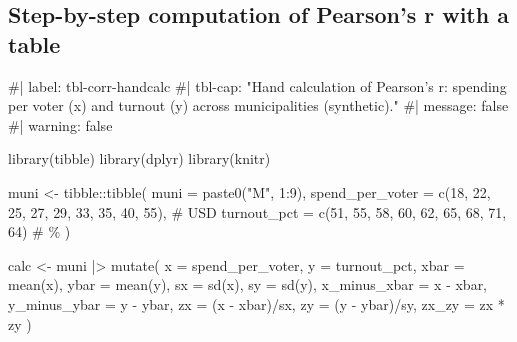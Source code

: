 \documentclass[
  letterpaper,
  DIV=11,
  numbers=noendperiod]{scrreprt}
\newenvironment{Shaded}{\begin{snugshade}}{\end{snugshade}}
\newcommand{\AttributeTok}[1]{\textcolor[rgb]{0.40,0.45,0.13}{#1}}
\newcommand{\CommentTok}[1]{\textcolor[rgb]{0.37,0.37,0.37}{#1}}
\newcommand{\DecValTok}[1]{\textcolor[rgb]{0.68,0.00,0.00}{#1}}
\newcommand{\FunctionTok}[1]{\textcolor[rgb]{0.28,0.35,0.67}{#1}}
\newcommand{\NormalTok}[1]{\textcolor[rgb]{0.00,0.23,0.31}{#1}}
\newcommand{\OtherTok}[1]{\textcolor[rgb]{0.00,0.23,0.31}{#1}}
\newcommand{\SpecialCharTok}[1]{\textcolor[rgb]{0.37,0.37,0.37}{#1}}
\newcommand{\StringTok}[1]{\textcolor[rgb]{0.13,0.47,0.30}{#1}}
\begin{document}
\subsection{Step-by-step computation of Pearson's r with a
table}\label{step-by-step-computation-of-pearsons-r-with-a-table}

\begin{Shaded}
\begin{Highlighting}[]
\CommentTok{\#| label: tbl{-}corr{-}handcalc}
\CommentTok{\#| tbl{-}cap: "Hand calculation of Pearson’s r: spending per voter (x) and turnout (y) across municipalities (synthetic)."}
\CommentTok{\#| message: false}
\CommentTok{\#| warning: false}

\FunctionTok{library}\NormalTok{(tibble)}
\FunctionTok{library}\NormalTok{(dplyr)}
\FunctionTok{library}\NormalTok{(knitr)}

\NormalTok{muni }\OtherTok{\textless{}{-}}\NormalTok{ tibble}\SpecialCharTok{::}\FunctionTok{tibble}\NormalTok{(}
  \AttributeTok{muni =} \FunctionTok{paste0}\NormalTok{(}\StringTok{"M"}\NormalTok{, }\DecValTok{1}\SpecialCharTok{:}\DecValTok{9}\NormalTok{),}
  \AttributeTok{spend\_per\_voter =} \FunctionTok{c}\NormalTok{(}\DecValTok{18}\NormalTok{, }\DecValTok{22}\NormalTok{, }\DecValTok{25}\NormalTok{, }\DecValTok{27}\NormalTok{, }\DecValTok{29}\NormalTok{, }\DecValTok{33}\NormalTok{, }\DecValTok{35}\NormalTok{, }\DecValTok{40}\NormalTok{, }\DecValTok{55}\NormalTok{),  }\CommentTok{\# USD}
  \AttributeTok{turnout\_pct      =} \FunctionTok{c}\NormalTok{(}\DecValTok{51}\NormalTok{, }\DecValTok{55}\NormalTok{, }\DecValTok{58}\NormalTok{, }\DecValTok{60}\NormalTok{, }\DecValTok{62}\NormalTok{, }\DecValTok{65}\NormalTok{, }\DecValTok{68}\NormalTok{, }\DecValTok{71}\NormalTok{, }\DecValTok{64}\NormalTok{)   }\CommentTok{\# \%}
\NormalTok{)}

\NormalTok{calc }\OtherTok{\textless{}{-}}\NormalTok{ muni }\SpecialCharTok{|\textgreater{}}
  \FunctionTok{mutate}\NormalTok{(}
    \AttributeTok{x   =}\NormalTok{ spend\_per\_voter,}
    \AttributeTok{y   =}\NormalTok{ turnout\_pct,}
    \AttributeTok{xbar =} \FunctionTok{mean}\NormalTok{(x), }\AttributeTok{ybar =} \FunctionTok{mean}\NormalTok{(y),}
    \AttributeTok{sx   =} \FunctionTok{sd}\NormalTok{(x),   }\AttributeTok{sy   =} \FunctionTok{sd}\NormalTok{(y),}
    \AttributeTok{x\_minus\_xbar =}\NormalTok{ x }\SpecialCharTok{{-}}\NormalTok{ xbar,}
    \AttributeTok{y\_minus\_ybar =}\NormalTok{ y }\SpecialCharTok{{-}}\NormalTok{ ybar,}
    \AttributeTok{zx =}\NormalTok{ (x }\SpecialCharTok{{-}}\NormalTok{ xbar)}\SpecialCharTok{/}\NormalTok{sx,}
    \AttributeTok{zy =}\NormalTok{ (y }\SpecialCharTok{{-}}\NormalTok{ ybar)}\SpecialCharTok{/}\NormalTok{sy,}
    \AttributeTok{zx\_zy =}\NormalTok{ zx }\SpecialCharTok{*}\NormalTok{ zy}
\NormalTok{  )}


\end{Highlighting}
\end{Shaded}
\end{document}
